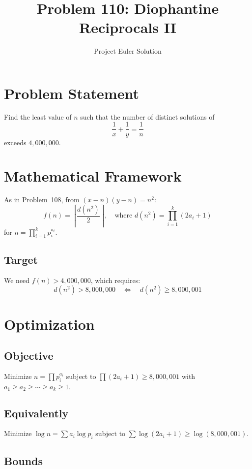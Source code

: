 \documentclass[12pt,a4paper]{article}
\title{Problem 110: Diophantine Reciprocals II}
\author{Project Euler Solution}
\date{}
\begin{document}
\maketitle

\section{Problem Statement}

Find the least value of $n$ such that the number of distinct solutions of
\[
\frac{1}{x} + \frac{1}{y} = \frac{1}{n}
\]
exceeds $4{,}000{,}000$.

\section{Mathematical Framework}

As in Problem~108, from $(x-n)(y-n) = n^2$:
\[
f(n) = \left\lceil \frac{d(n^2)}{2} \right\rceil, \quad \text{where } d(n^2) = \prod_{i=1}^k (2a_i + 1)
\]
for $n = \prod_{i=1}^k p_i^{a_i}$.

\subsection{Target}

We need $f(n) > 4{,}000{,}000$, which requires:
\[
d(n^2) > 8{,}000{,}000 \quad \Longleftrightarrow \quad d(n^2) \geq 8{,}000{,}001
\]

\section{Optimization}

\subsection{Objective}

Minimize $n = \prod p_i^{a_i}$ subject to $\prod (2a_i + 1) \geq 8{,}000{,}001$ with $a_1 \geq a_2 \geq \cdots \geq a_k \geq 1$.

\subsection{Equivalently}

Minimize $\log n = \sum a_i \log p_i$ subject to $\sum \log(2a_i + 1) \geq \log(8{,}000{,}001)$.

\subsection{Bounds}
\end{document}
